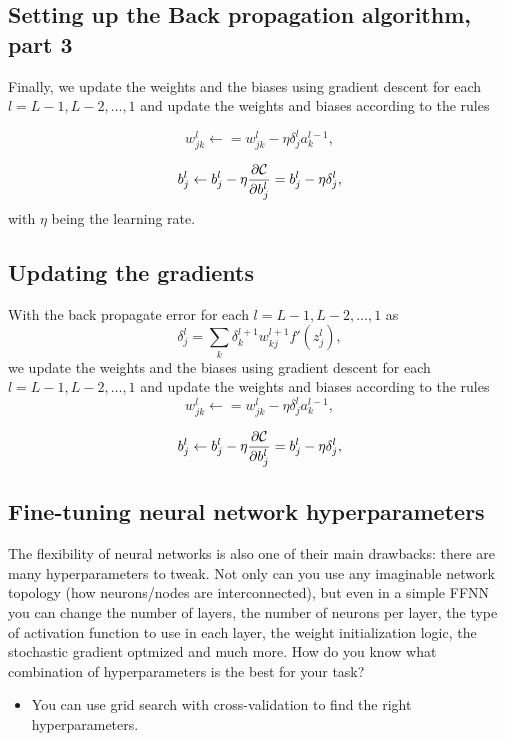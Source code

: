 \documentclass[%
oneside,                 %
final,                   %
10pt]{article}
\begin{document}
\subsection{Setting up the Back propagation algorithm, part 3}

Finally, we update the weights and the biases using gradient descent
for each $l=L-1,L-2,\dots,1$ and update the weights and biases
according to the rules

\[
w_{jk}^l\leftarrow  = w_{jk}^l- \eta \delta_j^la_k^{l-1},
\]

\[
b_j^l \leftarrow b_j^l-\eta \frac{\partial {\cal C}}{\partial b_j^l}=b_j^l-\eta \delta_j^l,
\]
with $\eta$ being the learning rate.

\subsection{Updating the gradients}

With the back propagate error for each $l=L-1,L-2,\dots,1$ as
\[
\delta_j^l = \sum_k \delta_k^{l+1}w_{kj}^{l+1}f'(z_j^l),
\]
we update the weights and the biases using gradient descent for each $l=L-1,L-2,\dots,1$ and update the weights and biases according to the rules
\[
w_{jk}^l\leftarrow  = w_{jk}^l- \eta \delta_j^la_k^{l-1},
\]

\[
b_j^l \leftarrow b_j^l-\eta \frac{\partial {\cal C}}{\partial b_j^l}=b_j^l-\eta \delta_j^l,
\]

\subsection{Fine-tuning neural network hyperparameters}

The flexibility of neural networks is also one of their main
drawbacks: there are many hyperparameters to tweak. Not only can you
use any imaginable network topology (how neurons/nodes are
interconnected), but even in a simple FFNN you can change the number
of layers, the number of neurons per layer, the type of activation
function to use in each layer, the weight initialization logic, the
stochastic gradient optmized and much more. How do you know what
combination of hyperparameters is the best for your task?

\begin{itemize}
\item You can use grid search with cross-validation to find the right hyperparameters.
\end{itemize}
\end{document}
